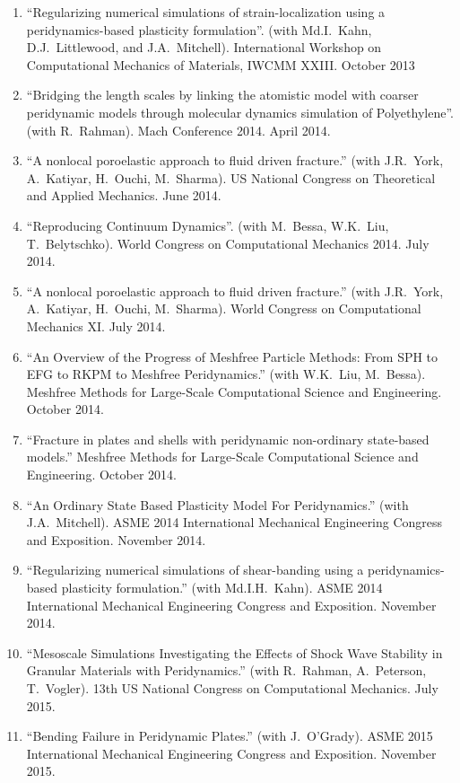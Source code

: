\begin{enumerate}[resume]
    \item ``Regularizing numerical simulations of strain-localization using a peridynamics-based plasticity formulation''. (with Md.I.~Kahn, D.J.~Littlewood, and J.A.~Mitchell). International Workshop on Computational Mechanics of Materials, IWCMM XXIII. October 2013
    \item ``Bridging the length scales by linking the atomistic model with coarser peridynamic models through molecular dynamics simulation of Polyethylene''. (with R.~Rahman). Mach Conference 2014.  April 2014.
    \item ``A nonlocal poroelastic approach to fluid driven fracture.'' (with J.R.~York, A.~Katiyar, H.~Ouchi, M.~Sharma). US National Congress on Theoretical and Applied Mechanics.  June 2014.
    \item ``Reproducing Continuum Dynamics''. (with M.~Bessa, W.K.~Liu, T.~Belytschko). World Congress on Computational Mechanics 2014.  July 2014.
    \item ``A nonlocal poroelastic approach to fluid driven fracture.'' (with J.R.~York, A.~Katiyar, H.~Ouchi, M.~Sharma). World Congress on Computational Mechanics XI.  July 2014.
    \item ``An Overview of the Progress of Meshfree Particle Methods: From SPH to EFG to RKPM to Meshfree Peridynamics.'' (with W.K.~Liu, M.~Bessa). Meshfree Methods for Large-Scale Computational Science and Engineering. October 2014.
    \item ``Fracture in plates and shells with peridynamic non-ordinary state-based models.''  Meshfree Methods for Large-Scale Computational Science and Engineering. October 2014.
    \item ``An Ordinary State Based Plasticity Model For Peridynamics.'' (with J.A.~Mitchell). ASME 2014 International Mechanical Engineering Congress and Exposition. November 2014.
    \item ``Regularizing numerical simulations of shear-banding using a peridynamics-based plasticity formulation.'' (with Md.I.H.~Kahn). ASME 2014 International Mechanical Engineering Congress and Exposition. November 2014.
    \item ``Mesoscale Simulations Investigating the Effects of Shock Wave Stability in Granular Materials with Peridynamics.'' (with R.~Rahman, A.~Peterson, T.~Vogler). 13th US National Congress on Computational Mechanics. July 2015.
    \item ``Bending Failure in Peridynamic Plates.'' (with J.~O'Grady). ASME 2015 International Mechanical Engineering Congress and Exposition. November 2015.

\end{enumerate}
